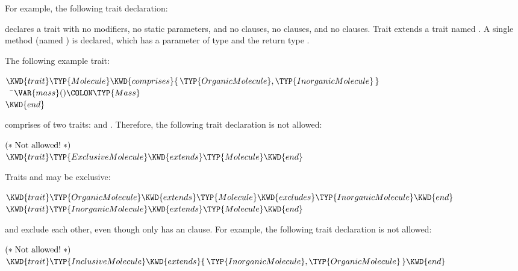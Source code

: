 

For example, the following trait declaration:

declares a trait  with
no modifiers,
no static parameters,
and
no  clauses,
no  clauses,
and no  clauses.
Trait  extends a trait named .
A single method (named ) is declared, which
has a parameter of type
 and the return type \TYP{()}.


The following example trait:
\begin{Fortress}
\(\KWD{trait} \TYP{Molecule} \KWD{comprises} \{\,\TYP{OrganicMolecule}, \TYP{InorganicMolecule}\,\}\)\\
{\tt~~}\pushtabs\=\+\(  \VAR{mass}()\COLON \TYP{Mass}\)\-\\\poptabs
\(\KWD{end}\)
\end{Fortress}
comprises of two traits:  and .
Therefore, the following trait declaration is not allowed:
\begin{Fortress}
\(\mathtt{(*}\;\hbox{\rm  Not allowed! \unskip}\;\mathtt{*)}\)\\
\(\KWD{trait} \TYP{ExclusiveMolecule} \KWD{extends} \TYP{Molecule} \KWD{end}\)
\end{Fortress}
Traits  and  may be exclusive:
%
\begin{Fortress}
\(\KWD{trait} \TYP{OrganicMolecule} \KWD{extends} \TYP{Molecule} \KWD{excludes} \TYP{InorganicMolecule} \KWD{end}\)\\[4pt]
\(\KWD{trait} \TYP{InorganicMolecule} \KWD{extends} \TYP{Molecule} \KWD{end}\)
\end{Fortress}
 and  exclude each other, even
though only  has an  clause.
For example, the following trait declaration is not allowed:
\begin{Fortress}
\(\mathtt{(*}\;\hbox{\rm  Not allowed! \unskip}\;\mathtt{*)}\)\\
\(\KWD{trait} \TYP{InclusiveMolecule} \KWD{extends} \{\,\TYP{InorganicMolecule}, \TYP{OrganicMolecule}\,\} \KWD{end}\)
\end{Fortress}

